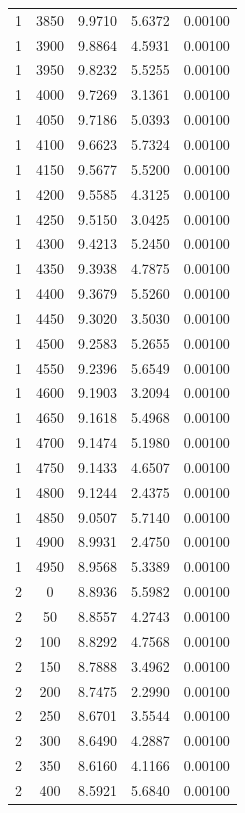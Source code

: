 \begin{longtable}{ccccc}
    1 & 3850 & 9.9710 & 5.6372 & 0.00100 \\
    1 & 3900 & 9.8864 & 4.5931 & 0.00100 \\
    1 & 3950 & 9.8232 & 5.5255 & 0.00100 \\
    1 & 4000 & 9.7269 & 3.1361 & 0.00100 \\
    1 & 4050 & 9.7186 & 5.0393 & 0.00100 \\
    1 & 4100 & 9.6623 & 5.7324 & 0.00100 \\
    1 & 4150 & 9.5677 & 5.5200 & 0.00100 \\
    1 & 4200 & 9.5585 & 4.3125 & 0.00100 \\
    1 & 4250 & 9.5150 & 3.0425 & 0.00100 \\
    1 & 4300 & 9.4213 & 5.2450 & 0.00100 \\
    1 & 4350 & 9.3938 & 4.7875 & 0.00100 \\
    1 & 4400 & 9.3679 & 5.5260 & 0.00100 \\
    1 & 4450 & 9.3020 & 3.5030 & 0.00100 \\
    1 & 4500 & 9.2583 & 5.2655 & 0.00100 \\
    1 & 4550 & 9.2396 & 5.6549 & 0.00100 \\
    1 & 4600 & 9.1903 & 3.2094 & 0.00100 \\
    1 & 4650 & 9.1618 & 5.4968 & 0.00100 \\
    1 & 4700 & 9.1474 & 5.1980 & 0.00100 \\
    1 & 4750 & 9.1433 & 4.6507 & 0.00100 \\
    1 & 4800 & 9.1244 & 2.4375 & 0.00100 \\
    1 & 4850 & 9.0507 & 5.7140 & 0.00100 \\
    1 & 4900 & 8.9931 & 2.4750 & 0.00100 \\
    1 & 4950 & 8.9568 & 5.3389 & 0.00100 \\
    2 & 0 & 8.8936 & 5.5982 & 0.00100 \\
    2 & 50 & 8.8557 & 4.2743 & 0.00100 \\
    2 & 100 & 8.8292 & 4.7568 & 0.00100 \\
    2 & 150 & 8.7888 & 3.4962 & 0.00100 \\
    2 & 200 & 8.7475 & 2.2990 & 0.00100 \\
    2 & 250 & 8.6701 & 3.5544 & 0.00100 \\
    2 & 300 & 8.6490 & 4.2887 & 0.00100 \\
    2 & 350 & 8.6160 & 4.1166 & 0.00100 \\
    2 & 400 & 8.5921 & 5.6840 & 0.00100 \\

\end{longtable}
